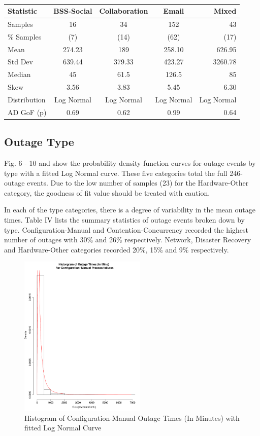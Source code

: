 \documentclass[conference]{IEEEtran}
\begin{document}
\begin {table}
\caption {}
\begin{center}
\begin{tabular}{l*{3}{c}r} Statistic & BSS-Social & Collaboration & Email & Mixed
\\ \hline Samples & 16 & 34 & 152 & 43
\\ \% Samples & (7) & (14) & (62) & (17)
\\ Mean & 274.23 & 189 & 258.10 & 626.95
\\ Std Dev & 639.44 & 379.33 & 423.27 & 3260.78
\\ Median & 45	& 61.5 & 126.5 & 85
\\ Skew & 3.56	& 3.83 & 5.45 & 6.30
\\ Distribution & Log Normal & Log Normal & Log Normal  & Log Normal
\\AD GoF (p) & 0.69 & 0.62 & 0.99 & 0.64
\end{tabular}
\end{center}
\end{table}


\subsection{Outage Type}

Fig. 6 - 10 and show the probability density function curves for outage events by type with a fitted Log Normal curve. These five categories total the full 246-outage events. Due to the low number of samples (23) for the Hardware-Other category, the goodness of fit value should be treated with caution. \par

In each of the type categories, there is a degree of variability in the mean outage times. Table IV lists the summary statistics of outage events broken down by type. Configuration-Manual and Contention-Concurrency recorded the highest number of outages with 30\% and 26\% respectively. Network, Disaster Recovery and Hardware-Other categories recorded 20\%, 15\% and 9\% respectively. 

\begin{figure}
\begin{center}
\includegraphics[width=6cm]{graph6.pdf} 
\caption{ Histogram of Configuration-Manual Outage Times (In Minutes) with fitted Log Normal Curve}
\end{center}
\label{fig:outagedistribution}
\end{figure}
\end{document}
